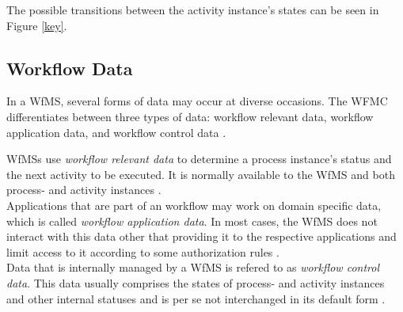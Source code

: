     The possible transitions between the activity instance's states can be seen in Figure \ref{key}.

  \subsection{Workflow Data} %
  \label{sub:workflow_data}
    In a \ac{WfMS}, several forms of data may occur at diverse occasions. The \ac{WFMC} differentiates between three types of data: workflow relevant data, workflow application data, and workflow control data \cite{Hollingsworth1995Wfmc}.

    \ac{WfMS}s use \emph{workflow relevant data} to determine a process instance's status and the next activity to be executed. It is normally available to the \ac{WfMS} and both process- and activity instances \cite{Hollingsworth1995Wfmc}. \\
    Applications that are part of an workflow may work on domain specific data, which is called \emph{workflow application data}. In most cases, the \ac{WfMS} does not interact with this data other that providing it to the respective applications and limit access to it according to some authorization rules \cite{Hollingsworth1995Wfmc,Casati1999Specification}. \\
    Data that is internally managed by a \ac{WfMS} is refered to as \emph{workflow control data}. This data usually comprises the states of process- and activity instances and other internal statuses and is per se not interchanged in its default form \cite{Hollingsworth1995Wfmc,Casati1999Specification}.

